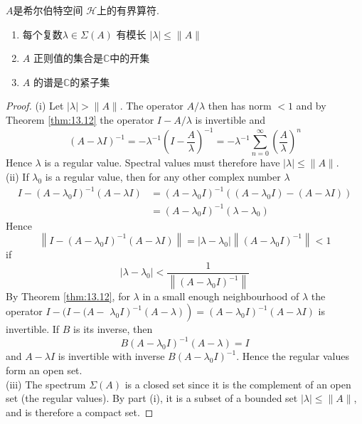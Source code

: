 \begin{theorem}\label{thm:13.17} 
    \(A\)是希尔伯特空间 \(\mathcal{H}\)上的有界算符.
    \begin{enumerate}[label=\roman*.]
        \item 每个复数\(\lambda \in \Sigma(A)\) 有模长 \(|\lambda| \leq\|A\|\)
        \item \(A\) 正则值的集合是\(\mathbb{C}\)中的开集
        \item \(A\) 的谱是\(\mathbb{C}\)的紧子集
    \end{enumerate}
\end{theorem}
\begin{proof}
    (i) Let \(|\lambda|>\|A\|\). The operator \(A / \lambda\) then has norm \(<1\) and by Theorem \ref{thm:13.12} the operator \(I-A / \lambda\) is invertible and
    \[
    (A-\lambda I)^{-1}=-\lambda^{-1}\left(I-\frac{A}{\lambda}\right)^{-1}=-\lambda^{-1} \sum_{n=0}^{\infty}\left(\frac{A}{\lambda}\right)^{n}
    \]
    Hence \(\lambda\) is a regular value. Spectral values must therefore have \(|\lambda| \leq\|A\|\).\\
    (ii) If \(\lambda_{0}\) is a regular value, then for any other complex number \(\lambda\)
    \[
    \begin{aligned}
    I-\left(A-\lambda_{0} I\right)^{-1}(A-\lambda I) &=\left(A-\lambda_{0} I\right)^{-1}\left(\left(A-\lambda_{0} I\right)-(A-\lambda I)\right) \\
    &=\left(A-\lambda_{0} I\right)^{-1}\left(\lambda-\lambda_{0}\right)
    \end{aligned}
    \]
    Hence
    \[
    \left\|I-\left(A-\lambda_{0} I\right)^{-1}(A-\lambda I)\right\|=\left|\lambda-\lambda_{0}\right|\left\|\left(A-\lambda_{0} I\right)^{-1}\right\|<1
    \]
    if
    \[
    \left|\lambda-\lambda_{0}\right|<\frac{1}{\left\|\left(A-\lambda_{0} I\right)^{-1}\right\|}
    \]
    By Theorem \ref{thm:13.12}, for \(\lambda\) in a small enough neighbourhood of \(\lambda\) the operator \(I-(I-(A-\) \(\left.\left.\lambda_{0} I\right)^{-1}(A-\lambda)\right)=\left(A-\lambda_{0} I\right)^{-1}(A-\lambda I)\) is invertible. If \(B\) is its inverse, then
    \[
    B\left(A-\lambda_{0} I\right)^{-1}(A-\lambda)=I
    \]
    and \(A-\lambda I\) is invertible with inverse \(B\left(A-\lambda_{0} I\right)^{-1}\). Hence the regular values form an open set.\\
    (iii) The spectrum \(\Sigma(A)\) is a closed set since it is the complement of an open set (the regular values). By part (i), it is a subset of a bounded set \(|\lambda| \leq\|A\|\), and is therefore a compact set.
\end{proof}
